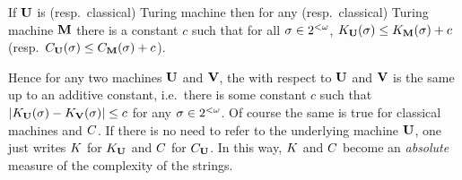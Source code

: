\begin{teorema}[Invariance]\label{intro:thm:invariance}
 If ${\bf U}$ is \opt \pfree (resp.\
classical) Turing machine then for any \pfree (resp.\ classical)
Turing machine ${\bf M}$ there is a constant $c$ such that for all
$\sigma\in2^{<\omega}$, $K_{{\bf U}}(\sigma)\leq K_{{\bf M}}(\sigma)+c$ (resp.\
$C_{{\bf U}}(\sigma)\leq C_{{\bf M}}(\sigma)+c$).
\end{teorema}

Hence for any two \pfree \opt machines ${\bf U}$ and ${\bf V}$, the \pfree
\kolcomp with respect to ${\bf U}$ and ${\bf V}$ is the same up to an
additive constant, i.e.\ there is some constant $c$ such that
$\left| K_{{\bf U}}(\sigma)-K_{{\bf V}}(\sigma) \right|\leq c$ for any $\sigma\in2^{<\omega}$. Of
course the same is true for classical machines and $\C$. If there
is no need to refer to the underlying \opt machine ${\bf U}$, one just
writes \glossary{$\K$}$\K$ for $K_{{\bf U}}$ and \glossary{$\C$}$\C$ for
$C_{{\bf U}}$. In this way, $\K$ and $\C$ become an {\em absolute} measure
of the complexity of the strings.

